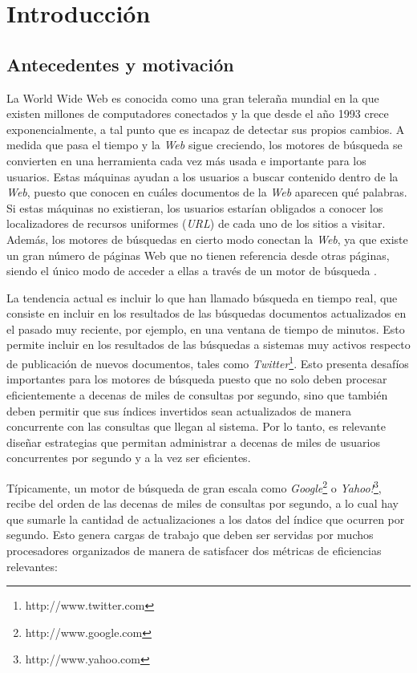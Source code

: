 \chapter{Introducci\'on}
\label{cap:intro}


\section{Antecedentes y motivaci\'on}
\label{intro:motivacion}
La World Wide Web es conocida como una gran teleraña mundial en la que existen millones de computadores conectados y la que desde el año 1993 crece exponencialmente, a tal punto que es incapaz de detectar sus propios cambios. A medida que pasa el tiempo y la \textit{Web} sigue creciendo, los motores de búsqueda se convierten en una herramienta cada vez más usada e importante para los usuarios. Estas máquinas ayudan a los usuarios a buscar contenido dentro de la \textit{Web}, puesto que conocen en cuáles documentos de la \textit{Web} aparecen qué palabras. Si estas máquinas no existieran, los usuarios estarían obligados a conocer los localizadores de recursos uniformes (\textit{URL}) de cada uno de los sitios a visitar. Además, los motores de búsquedas en cierto modo conectan la \textit{Web}, ya que existe un gran número de páginas Web que no tienen referencia desde otras páginas, siendo el único modo de acceder a ellas a través de un motor de búsqueda \citep{Baeza-Yates:2008}.  

La tendencia actual es incluir lo que han llamado búsqueda en tiempo real, que consiste en incluir en los resultados de las búsquedas documentos actualizados en el pasado muy reciente, por ejemplo, en una ventana de tiempo de minutos. Esto permite incluir en los resultados de las búsquedas a sistemas muy activos respecto de publicación de nuevos documentos, tales como \textit{Twitter}\footnote{http://www.twitter.com}. Esto presenta desafíos importantes para los motores de búsqueda puesto que no solo deben procesar eficientemente a decenas de miles de consultas por segundo, sino que también deben permitir que sus índices invertidos \citep{Zobel:2006} sean actualizados de manera concurrente con las consultas que llegan al sistema. Por lo tanto, es relevante diseñar estrategias que permitan administrar a decenas de miles de usuarios concurrentes por segundo y a la vez ser eficientes.

Típicamente, un motor de búsqueda de gran escala como \textit{Google}\footnote{http://www.google.com} o \textit{Yahoo!}\footnote{http://www.yahoo.com}, recibe del orden de las decenas de miles de consultas por segundo, a lo cual hay que sumarle la cantidad de actualizaciones a los datos del índice que ocurren por segundo. Esto genera cargas de trabajo que deben ser servidas por muchos procesadores organizados de manera de satisfacer dos métricas de eficiencias relevantes:

